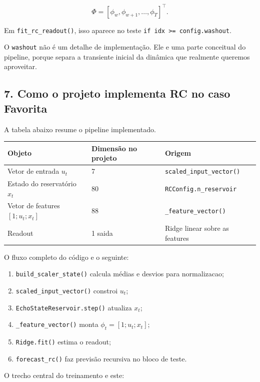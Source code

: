 \documentclass[12pt]{article}
\providecommand{\tightlist}{%
          \setlength{\itemsep}{0pt}\setlength{\parskip}{0pt}}
\begin{document}
\[
\Phi = [\phi_w, \phi_{w+1}, \dots, \phi_T]^\top.
\]

Em \texttt{fit\_rc\_readout()}, isso aparece no teste \texttt{if\ idx\ \textgreater{}=\ config.washout}.

O \texttt{washout} não é um detalhe de implementação. Ele e uma parte conceitual do pipeline, porque separa a transiente inicial da dinâmica que realmente queremos aproveitar.

\subsection{7. Como o projeto implementa RC no caso Favorita}\label{7-como-o-projeto-implementa-rc-no-caso-favorita}

A tabela abaixo resume o pipeline implementado.

\begin{longtable}[]{@{}lll@{}}
\toprule\noalign{}
Objeto & Dimensão no projeto & Origem \\
\midrule\noalign{}
\endhead
\bottomrule\noalign{}
\endlastfoot
Vetor de entrada \(u_t\) & 7 & \texttt{scaled\_input\_vector()} \\
Estado do reservatório \(x_t\) & 80 & \texttt{RCConfig.n\_reservoir} \\
Vetor de features \([1; u_t; x_t]\) & 88 & \texttt{\_feature\_vector()} \\
Readout & 1 saida & Ridge linear sobre as features \\
\end{longtable}

O fluxo completo do código e o seguinte:

\begin{enumerate}
\def\labelenumi{\arabic{enumi}.}
\tightlist
\item
  \texttt{build\_scaler\_state()} calcula médias e desvios para normalizacao;
\item
  \texttt{scaled\_input\_vector()} constroi \(u_t\);
\item
  \texttt{EchoStateReservoir.step()} atualiza \(x_t\);
\item
  \texttt{\_feature\_vector()} monta \(\phi_t = [1; u_t; x_t]\);
\item
  \texttt{Ridge.fit()} estima o readout;
\item
  \texttt{forecast\_rc()} faz previsão recursiva no bloco de teste.
\end{enumerate}

O trecho central do treinamento e este:
\end{document}
